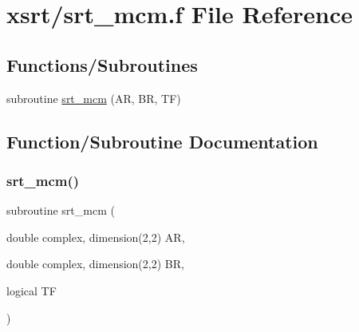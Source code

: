 \hypertarget{xsrt_2srt__mcm_8f}{}\section{xsrt/srt\+\_\+mcm.f File Reference}
\label{xsrt_2srt__mcm_8f}
\subsection*{Functions/\+Subroutines}
\begin{DoxyCompactItemize}
\item 
subroutine \hyperlink{xsrt_2srt__mcm_8f_a5ce07d8afa81bd629b6c20eb0ee405d9}{srt\+\_\+mcm} (AR, BR, TF)
\end{DoxyCompactItemize}


\subsection{Function/\+Subroutine Documentation}
\mbox{\label{xsrt_2srt__mcm_8f_a5ce07d8afa81bd629b6c20eb0ee405d9}} 
\subsubsection{\texorpdfstring{srt\+\_\+mcm()}{srt\_mcm()}}
{\footnotesize\ttfamily subroutine srt\+\_\+mcm (\begin{DoxyParamCaption}\item[{double complex, dimension(2,2)}]{AR,  }\item[{double complex, dimension(2,2)}]{BR,  }\item[{logical}]{TF }\end{DoxyParamCaption})}

